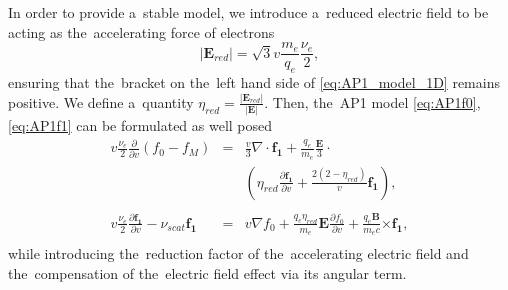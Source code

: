 \documentclass[
 aps,
 jmp,
 amsmath,amssymb,
 twocolumn,
]{revtex4-1}
\newcommand{\pdv}[2]{\frac{\partial{#1}}{\partial{#2}}}
\newcommand{\vect}[1]{\boldsymbol{#1}}
\newcommand{\nue}{\nu_{e}}
\newcommand{\nuscat}{\nu_{scat}}
\newcommand{\vmag}{v}
\newcommand{\E}{\vect{E}}
\newcommand{\B}{\vect{B}}
\newcommand{\qe}{q_e}
\newcommand{\me}{m_e}
\newcommand{\fM}{f_M}
\newcommand{\fzero}{f_0}
\newcommand{\fone}{{\vect{f_1}}}
\begin{document}
In order to provide a~stable model, we introduce a~reduced electric field
to be acting as the~accelerating force of electrons
\begin{equation}
  |\E_{red}| = \sqrt{3} \vmag\frac{\me}{\qe}\frac{\nue}{2} ,
  \label{eq:Elimit}
\end{equation}
ensuring that the~bracket on the~left hand side of \eqref{eq:AP1_model_1D}
remains positive. We define a~quantity $\eta_{red} = \frac{|\E_{red}|}{|\E|}$.
Then, the~AP1 model \eqref{eq:AP1f0}, \eqref{eq:AP1f1} can be formulated 
as well posed 
\begin{eqnarray}
  \vmag\frac{\nue}{2}\pdv{}{\vmag}\left(\fzero - \fM \right) &=&
  \frac{\vmag}{3}\nabla\cdot\fone + \frac{\qe}{\me}\frac{\E}{3}\cdot
  \nonumber \\
  &&\left(
  \eta_{red}\pdv{\fone}{\vmag} + \frac{2(2-\eta_{red})}{\vmag}\fone\right) , 
  \nonumber \\
  \label{eq:AP1f0_app}\\
  \vmag\frac{\nue}{2}\pdv{\fone}{\vmag}
  - \nuscat\fone &=& 
  \vmag\nabla\fzero + 
  \frac{\qe\eta_{red}}{\me}\E\pdv{\fzero}{\vmag} 
  +\frac{\qe\B}{\me c}\vect{\times} \fone
  ,
  \nonumber \\
  \label{eq:AP1f1_app}
\end{eqnarray}
while introducing the~reduction factor of the~accelerating electric field
and the~compensation of the~electric field effect via its angular term.  






\clearpage
\end{document}
